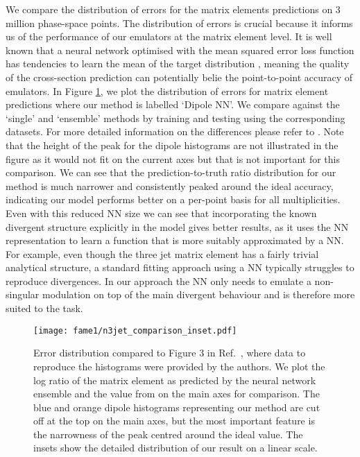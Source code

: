 \documentclass[main.tex]{subfiles}
\begin{document}
We compare the distribution of errors for the matrix elements predictions on 3 million phase-space points.
The distribution of errors is crucial because it informs us of the performance of our emulators at the matrix element level.
It is well known that a neural network optimised with the mean squared error loss function has tendencies to learn the mean of the target distribution \cite{Nachman_2020},
meaning the quality of the cross-section prediction can potentially belie the point-to-point accuracy of emulators.
In Figure \ref{fig:comparison}, we plot the distribution of errors for matrix element predictions where our method is labelled `Dipole NN'.
We compare against the `single' and `ensemble' methods by training and testing using the corresponding datasets.
For more detailed information on the differences please refer to \cite{Badger:2020uow}.
Note that the height of the peak for the dipole histograms are not illustrated in the figure as it would not fit on the current axes but that is not important for this comparison.
We can see that the prediction-to-truth ratio distribution for our method is much narrower and consistently peaked around the ideal accuracy, indicating our model performs better on a per-point basis for all multiplicities.
Even with this reduced NN size we can see that incorporating the known
divergent structure explicitly in the model gives better results, as it
uses the NN representation to learn a function that is more
suitably approximated by a NN.
For example, even though the three jet matrix element has a fairly trivial analytical structure, a standard
fitting approach using a NN typically struggles to reproduce
divergences. In our approach the NN only needs to emulate a non-singular
modulation on top of the main divergent behaviour and is therefore more
suited to the task.

\begin{figure}
    \centering
    \texttt{[image: fame1/n3jet\_comparison\_inset.pdf]}
    \caption{Error distribution compared to Figure 3 in Ref.~\cite{Badger:2020uow}, where data to reproduce the histograms were provided by the authors.
    We plot the log ratio of the matrix element as predicted by the neural network ensemble and the value from {\NJet} on the main axes for comparison. The blue and orange dipole histograms representing our method 
    are cut off at the top on the main axes, but the most important feature is the narrowness of the peak centred around the ideal value.
    The insets show the detailed distribution of our result on a linear scale.}
    \label{fig:comparison}
\end{figure}
\end{document}
